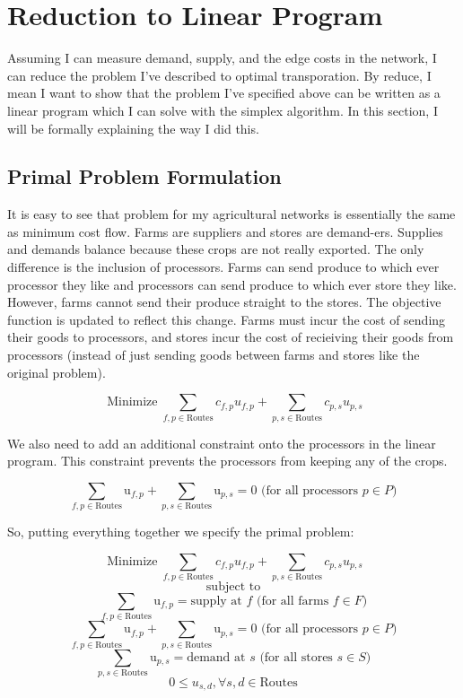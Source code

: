 \documentclass{report}
\begin{document}
\section{Reduction to Linear Program}

Assuming I can measure demand, supply, and the edge costs in the network, I can reduce the problem I've described to optimal transporation. By reduce, I mean I want to show that the problem I've specified above can be  written as a linear 
program which I can solve with the simplex algorithm. In this section, I will be formally explaining the way I did this.

\subsection{Primal Problem Formulation}
It is easy to see that problem for my agricultural networks is essentially the same as minimum cost flow. Farms are suppliers and stores are demand-ers. Supplies and demands balance because these crops are not really exported. The only difference is the inclusion of processors. Farms can send produce to which ever processor they like and processors can send produce to which ever store they like. However, farms cannot send their produce straight to the stores. The objective function is updated to reflect this change. Farms must incur the cost of sending their goods to processors, and stores incur the cost of recieiving their goods from processors (instead of just sending goods between farms and stores like the original problem).

$$\operatorname{Minimize} \sum_{f,p \in \text{Routes}} c_{f,p} u_{f,p} + \sum_{p,s \in \text{Routes}} c_{p,s} u_{p,s}$$

We also need to add an additional constraint onto the processors in the linear program. This constraint prevents the processors from keeping any of the crops.

$$\sum_{f,p \in \text{Routes}} \text{u}_{f,p} + \sum_{p,s \in \text{Routes}} \text{u}_{p,s} = 0 \text{ (for all processors } p \in P)$$

So, putting everything together we specify the primal problem:

$$\operatorname{Minimize} \sum_{f,p \in \text{Routes}} c_{f,p} u_{f,p} + \sum_{p,s \in \text{Routes}} c_{p,s} u_{p,s}$$
$$\text{subject to}$$
$$\sum_{f,p \in \text{Routes}} \text{u}_{f,p}= \text{supply at } f \text{ (for all farms } f \in F)$$
$$\sum_{f,p \in \text{Routes}} \text{u}_{f,p} + \sum_{p,s \in \text{Routes}} \text{u}_{p,s} = 0 \text{ (for all processors } p \in P)$$
$$\sum_{p,s \in \text{Routes}} \text{u}_{p,s}= \text{demand at } s \text{ (for all stores } s \in S)$$
$$0 \leq u_{s,d}, \forall s,d \in \text{Routes}$$
\end{document}
